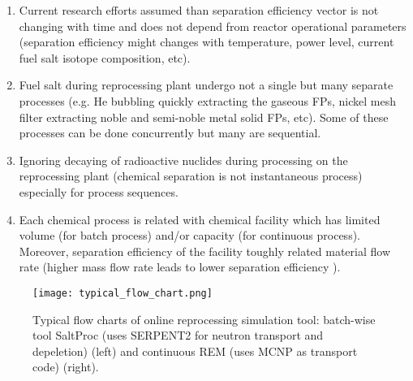 \begin{enumerate}
	\item Current research efforts assumed than separation 
efficiency vector is not changing with time and does not depend from reactor 
operational parameters (separation efficiency might changes with temperature, 
power level, current fuel salt isotope composition, etc).
	\item Fuel salt during reprocessing plant undergo not a single but many 
	separate processes 
	(e.g. He bubbling quickly extracting the gaseous \glspl{FP}, nickel mesh filter 
	extracting noble  and  semi-noble  metal  solid  \glspl{FP}, etc). Some of 
	these processes can be done concurrently but many are sequential.
	\item Ignoring decaying of radioactive nuclides during processing on 
	the reprocessing plant (chemical separation is not instantaneous process) 
	especially for process sequences. 
	\item Each chemical process is related with chemical facility which has 
	limited volume (for batch process) and/or capacity (for continuous process). 
	Moreover, separation efficiency of the facility toughly related material flow 
	rate (higher mass flow rate leads to lower separation efficiency \cite{briggs_molten-salt_1969}).
\end{enumerate}

\begin{figure}[hbp!] %
  \texttt{[image: typical\_flow\_chart.png]}
  \caption{Typical flow charts of online reprocessing simulation tool:
  batch-wise tool SaltProc (uses SERPENT2 for neutron transport and 
  depeletion) \cite{rykhlevskii_modeling_2019}
   (left) and continuous  REM (uses MCNP as transport code) 
   \cite{heuer_simulation_2010} (right).} 
  \label{fig:typical_flow_chart}
\end{figure}

